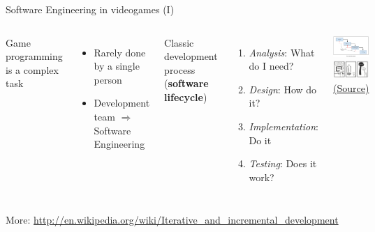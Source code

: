 \documentclass[10pt,compress]{beamer} %
\begin{document}
\begin{frame}{Software Engineering in videogames (I)}
    \begin{columns}
	Game programming is a complex task
	\begin{itemize}
		\item Rarely done by a single person
		\item Development team $\Rightarrow$ \alert{Software Engineering}
  	\end{itemize}
	Classic development process (\textbf{software lifecycle})\\
	\begin{enumerate}
		\item \textit{Analysis}: What do I need?
		\item \textit{Design}: How do it?
		\item \textit{Implementation}: Do it
		\item \textit{Testing}: Does it work?
  	\end{enumerate}
			\centering\includegraphics[width=\linewidth]{figs/process}\\
			\centering\includegraphics[width=\linewidth]{figs/ariane}\\
			\tiny{\href{http://www.cosc.canterbury.ac.nz/csfieldguide/SoftwareEngineering.html}{(Source)}}
	\end{columns}
	\bigskip
	\scriptsize{More: \url{http://en.wikipedia.org/wiki/Iterative\_and\_incremental\_development}}
\end{frame}
\end{document}
